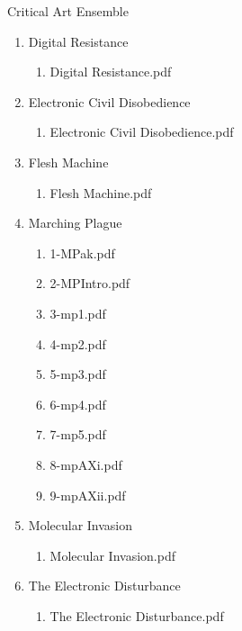 \documentclass[11pt]{article}
\begin{document}
\item Critical Art Ensemble
\label{sec-1-1-1-1-11-9}
\begin{enumerate}
\item Digital Resistance
\label{sec-1-1-1-1-11-9-1}
\begin{enumerate}
\item Digital Resistance.pdf
\label{sec-1-1-1-1-11-9-1-1}
\end{enumerate}

\item Electronic Civil Disobedience
\label{sec-1-1-1-1-11-9-2}
\begin{enumerate}
\item Electronic Civil Disobedience.pdf
\label{sec-1-1-1-1-11-9-2-1}
\end{enumerate}

\item Flesh Machine
\label{sec-1-1-1-1-11-9-3}
\begin{enumerate}
\item Flesh Machine.pdf
\label{sec-1-1-1-1-11-9-3-1}
\end{enumerate}

\item Marching Plague
\label{sec-1-1-1-1-11-9-4}
\begin{enumerate}
\item 1-MPak.pdf
\label{sec-1-1-1-1-11-9-4-1}

\item 2-MPIntro.pdf
\label{sec-1-1-1-1-11-9-4-2}

\item 3-mp1.pdf
\label{sec-1-1-1-1-11-9-4-3}

\item 4-mp2.pdf
\label{sec-1-1-1-1-11-9-4-4}

\item 5-mp3.pdf
\label{sec-1-1-1-1-11-9-4-5}

\item 6-mp4.pdf
\label{sec-1-1-1-1-11-9-4-6}

\item 7-mp5.pdf
\label{sec-1-1-1-1-11-9-4-7}

\item 8-mpAXi.pdf
\label{sec-1-1-1-1-11-9-4-8}

\item 9-mpAXii.pdf
\label{sec-1-1-1-1-11-9-4-9}
\end{enumerate}

\item Molecular Invasion
\label{sec-1-1-1-1-11-9-5}
\begin{enumerate}
\item Molecular Invasion.pdf
\label{sec-1-1-1-1-11-9-5-1}
\end{enumerate}

\item The Electronic Disturbance
\label{sec-1-1-1-1-11-9-6}
\begin{enumerate}
\item The Electronic Disturbance.pdf
\label{sec-1-1-1-1-11-9-6-1}
\end{enumerate}
\end{enumerate}
\end{document}
